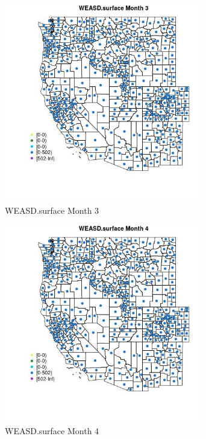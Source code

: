 \begin{figure} 
\centering  
\includegraphics[width=0.77\textwidth]{Code_Outputs/df_report_ML_predictors_CountyCentroid_Locations_Dates_2008-01-01to2018-12-31_MapObsMo3WEASDsurface.jpg} 
\caption{\label{fig:df_report_ML_predictors_CountyCentroid_Locations_Dates_2008-01-01to2018-12-31MapObsMo3WEASDsurface}WEASD.surface Month 3} 
\end{figure} 
 

\begin{figure} 
\centering  
\includegraphics[width=0.77\textwidth]{Code_Outputs/df_report_ML_predictors_CountyCentroid_Locations_Dates_2008-01-01to2018-12-31_MapObsMo4WEASDsurface.jpg} 
\caption{\label{fig:df_report_ML_predictors_CountyCentroid_Locations_Dates_2008-01-01to2018-12-31MapObsMo4WEASDsurface}WEASD.surface Month 4} 
\end{figure} 
 

